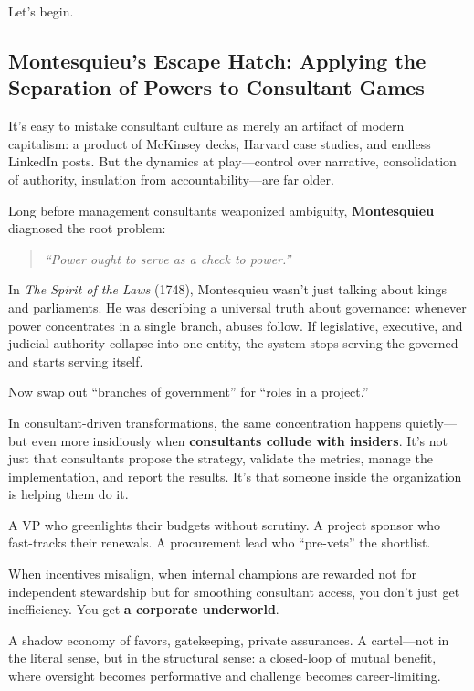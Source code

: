Let’s begin.


\subsection{Montesquieu’s Escape Hatch: Applying the Separation of Powers to Consultant Games}

It’s easy to mistake consultant culture as merely an artifact of modern capitalism: a product of McKinsey decks, Harvard case studies, and endless LinkedIn posts. But the dynamics at play—control over narrative, consolidation of authority, insulation from accountability—are far older.

Long before management consultants weaponized ambiguity, \textbf{Montesquieu} diagnosed the root problem:

\begin{quote}
\textit{“Power ought to serve as a check to power.”}
\end{quote}

In \textit{The Spirit of the Laws} (1748), Montesquieu wasn’t just talking about kings and parliaments. He was describing a universal truth about governance: whenever power concentrates in a single branch, abuses follow. If legislative, executive, and judicial authority collapse into one entity, the system stops serving the governed and starts serving itself.

Now swap out “branches of government” for “roles in a project.”

\medskip

In consultant-driven transformations, the same concentration happens quietly—but even more insidiously when \textbf{consultants collude with insiders}.  
It’s not just that consultants propose the strategy, validate the metrics, manage the implementation, and report the results.  
It’s that someone inside the organization is helping them do it.  

A VP who greenlights their budgets without scrutiny.  
A project sponsor who fast-tracks their renewals.  
A procurement lead who “pre-vets” the shortlist.  

When incentives misalign, when internal champions are rewarded not for independent stewardship but for smoothing consultant access, you don’t just get inefficiency. You get \textbf{a corporate underworld}.  

A shadow economy of favors, gatekeeping, private assurances.  
A cartel—not in the literal sense, but in the structural sense: a closed-loop of mutual benefit, where oversight becomes performative and challenge becomes career-limiting.  

